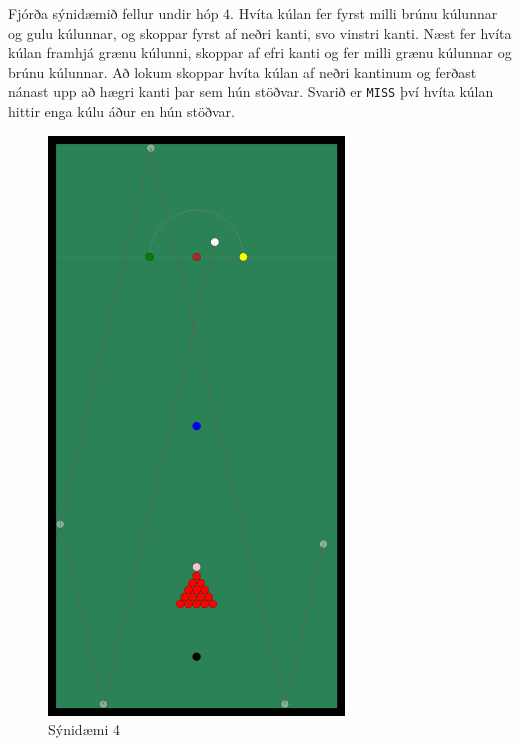 Fjórða sýnidæmið fellur undir hóp $4$. Hvíta kúlan fer fyrst milli brúnu kúlunnar og gulu kúlunnar, og skoppar fyrst af neðri kanti, svo vinstri kanti.
Næst fer hvíta kúlan framhjá grænu kúlunni, skoppar af efri kanti og fer  milli grænu kúlunnar og brúnu kúlunnar.
Að lokum skoppar hvíta kúlan af neðri kantinum og ferðast nánast upp að hægri kanti þar sem hún stöðvar.
Svarið er \texttt{MISS} því hvíta kúlan hittir enga kúlu áður en hún stöðvar.
\begin{figure}[ht!]
  \centering
    \includegraphics[width=0.7\textwidth]{sample4}
  \caption{Sýnidæmi 4}
\end{figure}
